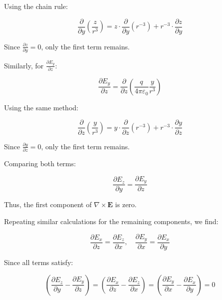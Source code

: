 \documentclass[a4paper,12pt]{article}
\begin{document}
Using the chain rule:

\begin{equation}
\frac{\partial}{\partial y} \left( \frac{z}{r^3} \right) =
z \cdot \frac{\partial}{\partial y} \left( r^{-3} \right) + r^{-3} \cdot \frac{\partial z}{\partial y}
\end{equation}

Since \( \frac{\partial z}{\partial y} = 0 \), only the first term remains.

Similarly, for \( \frac{\partial E_y}{\partial z} \):

\begin{equation}
\frac{\partial E_y}{\partial z} = \frac{\partial}{\partial z} \left( \frac{q}{4\pi\varepsilon_0} \frac{y}{r^3} \right)
\end{equation}

Using the same method:

\begin{equation}
\frac{\partial}{\partial z} \left( \frac{y}{r^3} \right) =
y \cdot \frac{\partial}{\partial z} \left( r^{-3} \right) + r^{-3} \cdot \frac{\partial y}{\partial z}
\end{equation}

Since \( \frac{\partial y}{\partial z} = 0 \), only the first term remains.

Comparing both terms:

\begin{equation}
\frac{\partial E_z}{\partial y} = \frac{\partial E_y}{\partial z}
\end{equation}

Thus, the first component of \( \nabla \times \mathbf{E} \) is zero.

Repeating similar calculations for the remaining components, we find:

\begin{equation}
\frac{\partial E_x}{\partial z} = \frac{\partial E_z}{\partial x}, \quad
\frac{\partial E_y}{\partial x} = \frac{\partial E_x}{\partial y}
\end{equation}

Since all terms satisfy:

\begin{equation}
\left( \frac{\partial E_z}{\partial y} - \frac{\partial E_y}{\partial z} \right) =
\left( \frac{\partial E_x}{\partial z} - \frac{\partial E_z}{\partial x} \right) =
\left( \frac{\partial E_y}{\partial x} - \frac{\partial E_x}{\partial y} \right) = 0
\end{equation}
\end{document}
